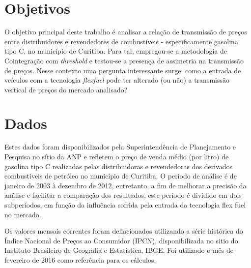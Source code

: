 \documentclass[
	article,			%
	12pt,				%
	openright,			%
	oneside,			%
	a4paper,			%
	english,			%
	brazil				%
	]{abntex2}
\begin{document}
\section{Objetivos}

O objetivo principal deste trabalho é analisar a relação de transmissão de preços entre distribuidores e revendedores de combustíveis - especificamente gasolina tipo C, no município de Curitiba. Para tal, empregou-se a metodologia de Cointegração com \textit{threshold} e testou-se a presença de assimetria na transmissão de preços. Nesse contexto uma pergunta interessante surge: como a entrada de veículos com a tecnologia \textit{flexfuel} pode ter alterado (ou não) a transmissão vertical de preços do mercado analisado? 

\section{Dados}

Estes dados foram disponibilizados pela Superintendência de Planejamento e Pesquisa no sítio da ANP e refletem o preço de venda médio (por litro) de gasolina tipo C realizadas pelas distribuidoras e revendedoras dos derivados combustíveis de petróleo no município de Curitiba. O período de análise é de janeiro de 2003 à dezembro de 2012, entretanto, a fim de melhorar a precisão da análise e facilitar a comparação dos resultados, este período é dividido em dois subperíodos, em função da influência sofrida pela entrada da tecnologia flex fuel no mercado.

Os valores mensais correntes foram deflacionados utilizando a série histórica do Índice Nacional de Preços ao Consumidor (IPCN), disponibilizada no sitio do Instituto Brasileiro de Geografia e Estatística, IBGE. Foi utilizado o mês de fevereiro de 2016 como referência para os cálculos.
\end{document}
